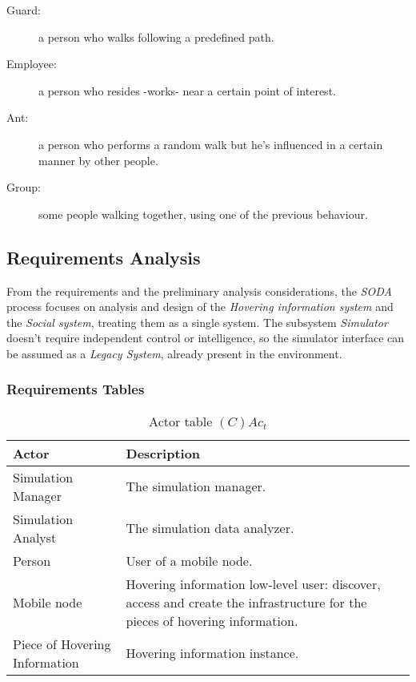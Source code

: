 \begin{description}
	\item[Guard:] a person who walks following a predefined path.
	\item[Employee:] a person who resides -works- near a certain point of interest.
	\item[Ant:] a person who performs a random walk but he's influenced in a
		certain manner by other people.
	\item[Group:] some people walking together, using one of the previous
		behaviour.
\end{description}

\subsection{Requirements Analysis}

From the requirements and the preliminary analysis considerations, the
\emph{SODA} process focuses on analysis and design of the \emph{Hovering
information system} and the \emph{Social system}, treating them as a single
system. The subsystem \emph{Simulator} doesn't require independent control or
intelligence, so the simulator interface can be assumed as a \emph{Legacy
System}, already present in the environment.

\subsubsection{Requirements Tables}

\begin{table}[H]
	\centering
	\begin{tabular}{|p{4cm}|p{8cm}|}
			\hline
			\textbf{Actor} & \textbf{Description} \\
			\hline
			Simulation Manager & The simulation manager. \\
			\hline
			Simulation Analyst & The simulation data analyzer. \\
			\hline
			Person & User of a mobile node. \\
			\hline
			Mobile node & Hovering information low-level user: discover, access and
			create the infrastructure for the pieces of hovering information. \\
			\hline
			Piece of Hovering Information & Hovering information instance. \\
			\hline
		\end{tabular}
	\caption{Actor table $(C)Ac_t$}
	\label{tab:cact}
\end{table}

